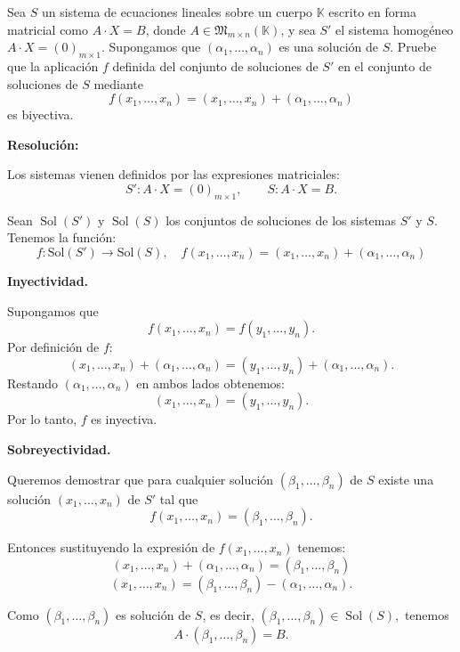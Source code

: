 \documentclass[a4paper,12pt]{article}
\begin{document}
\begin{ejercicio}[title=Ejercicio 41]
Sea $S$ un sistema de ecuaciones lineales sobre un cuerpo $\mathbb{K}$ escrito en forma matricial como $A \cdot X = B$, donde $A \in \mathfrak{M}_{m\times n}(\mathbb{K})$, y sea $S'$ el sistema homogéneo $A \cdot X = (0)_{m\times 1}$.  
Supongamos que $(\alpha_1,\ldots,\alpha_n)$ es una solución de $S$.  
Pruebe que la aplicación $f$ definida del conjunto de soluciones de $S'$ en el conjunto de soluciones de $S$ mediante
\[
f(x_1,\ldots,x_n) = (x_1,\ldots,x_n) + (\alpha_1,\ldots,\alpha_n)
\]
es biyectiva.

\tcblower
\textbf{Resolución:}

Los sistemas vienen definidos por las expresiones matriciales:
\[
S': A \cdot X = (0)_{m\times 1}, \qquad 
S: A \cdot X = B.
\]

Sean $\operatorname{Sol}(S')$ y $\operatorname{Sol}(S)$ los conjuntos de soluciones de los sistemas $S'$ y $S$. Tenemos la función:
\[
f: \text{Sol}(S') \longrightarrow \text{Sol}(S), \quad 
f(x_1,\dots,x_n) = (x_1,\dots,x_n) + (\alpha_1,\dots,\alpha_n)
\]

\vspace{0.5em}

\textbf{Inyectividad.}

Supongamos que 
\[
f(x_1,\ldots,x_n) = f(y_1,\ldots,y_n).
\]
Por definición de $f$:
\[
(x_1,\ldots,x_n) + (\alpha_1,\ldots,\alpha_n) = (y_1,\ldots,y_n) + (\alpha_1,\ldots,\alpha_n).
\]
Restando $(\alpha_1,\ldots,\alpha_n)$ en ambos lados obtenemos:
\[
(x_1,\ldots,x_n) = (y_1,\ldots,y_n).
\]
Por lo tanto, $f$ es inyectiva.

\vspace{0.5em}

\textbf{Sobreyectividad.}

Queremos demostrar que para cualquier solución $(\beta_1,\ldots,\beta_n)$ de $S$ existe una solución $(x_1,\ldots,x_n)$ de $S'$ tal que
\[
f(x_1,\ldots,x_n) = (\beta_1,\ldots,\beta_n).
\]

Entonces sustituyendo la expresión de $f(x_1,\ldots,x_n)$ tenemos:
\[
(x_1,\ldots,x_n) + (\alpha_1,\ldots,\alpha_n) = (\beta_1,\ldots,\beta_n)
\]
\[
(x_1,\ldots,x_n) = (\beta_1,\ldots,\beta_n) - (\alpha_1,\ldots,\alpha_n).
\]

Como $(\beta_1,\ldots,\beta_n)$ es solución de $S$, es decir,
\(
(\beta_1,\ldots,\beta_n) \in \operatorname{Sol}(S),
\)
tenemos
\[
A \cdot (\beta_1,\ldots,\beta_n) = B.
\]
\end{ejercicio}
\end{document}
